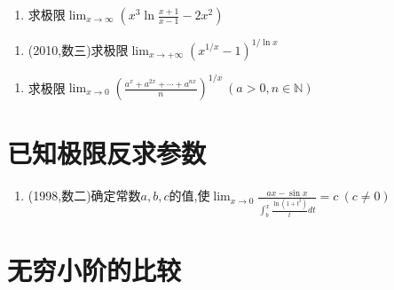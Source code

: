 \documentclass[12pt, a4paper, oneside, UTF8]{ctexbook}
\begin{document}
\begin{enumerate}[label=\arabic*.,start=8]
    \item  求极限$\lim_{x\to\infty}\left(x^3\ln\frac{x+1}{x-1}-2x^2\right)$
    
    \begin{solution}
    \newpage
    \end{solution}
\end{enumerate}

\begin{enumerate}[label=\arabic*.,start=9]
    \item  (2010,数三)求极限$\lim_{x\to+\infty}\left(x^{1/x}-1\right)^{1/\ln x}$
    
    \begin{solution}
    \newpage
    \end{solution}
\end{enumerate}

\begin{enumerate}[label=\arabic*.,start=10]
    \item  求极限$\lim_{x\to0}\left(\frac{a^x+a^{2x}+\cdots+a^{nx}}{n}\right)^{1/x}\ (a>0,n\in\mathbb{N})$
    
    \begin{solution}
    
    \end{solution}
\end{enumerate}

\section{已知极限反求参数}

\begin{enumerate}[label=\arabic*.,start=11]
    \item  (1998,数二)确定常数$a,b,c$的值,使$\lim_{x\to0}\frac{ax-\sin x}{\int_b^x\frac{\ln(1+t^3)}{t}dt}=c\ (c\neq0)$
    
    \begin{solution}
    \newpage
    \end{solution}
\end{enumerate}

\section{无穷小阶的比较}
\end{document}

